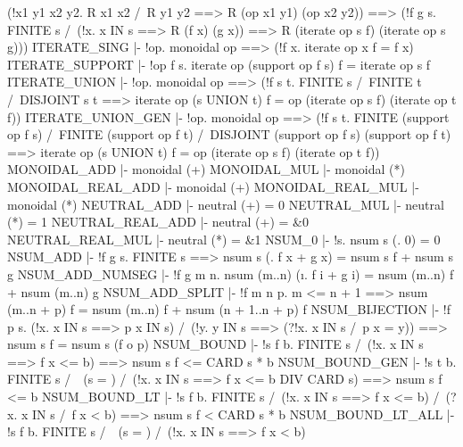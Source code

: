                    (!x1 y1 x2 y2.
                        R x1 x2 /\ R y1 y2 ==> R (op x1 y1) (op x2 y2))
                   ==> (!f g s.
                            FINITE s /\ (!x. x IN s ==> R (f x) (g x))
                            ==> R (iterate op s f) (iterate op s g)))
\ENDTHEOREM
\THEOREM ITERATE\_SING
  |- !op. monoidal op ==> (!f x. iterate op {x} f = f x)
\ENDTHEOREM
\THEOREM ITERATE\_SUPPORT
  |- !op f s. iterate op (support op f s) f = iterate op s f
\ENDTHEOREM
\THEOREM ITERATE\_UNION
  |- !op. monoidal op
          ==> (!f s t.
                   FINITE s /\ FINITE t /\ DISJOINT s t
                   ==> iterate op (s UNION t) f =
                       op (iterate op s f) (iterate op t f))
\ENDTHEOREM
\THEOREM ITERATE\_UNION\_GEN
  |- !op. monoidal op
          ==> (!f s t.
                   FINITE (support op f s) /\
                   FINITE (support op f t) /\
                   DISJOINT (support op f s) (support op f t)
                   ==> iterate op (s UNION t) f =
                       op (iterate op s f) (iterate op t f))
\ENDTHEOREM
\THEOREM MONOIDAL\_ADD
  |- monoidal (+)
\ENDTHEOREM
\THEOREM MONOIDAL\_MUL
  |- monoidal (*)
\ENDTHEOREM
\THEOREM MONOIDAL\_REAL\_ADD
  |- monoidal (+)
\ENDTHEOREM
\THEOREM MONOIDAL\_REAL\_MUL
  |- monoidal (*)
\ENDTHEOREM
\THEOREM NEUTRAL\_ADD
  |- neutral (+) = 0
\ENDTHEOREM
\THEOREM NEUTRAL\_MUL
  |- neutral (*) = 1
\ENDTHEOREM
\THEOREM NEUTRAL\_REAL\_ADD
  |- neutral (+) = &0
\ENDTHEOREM
\THEOREM NEUTRAL\_REAL\_MUL
  |- neutral (*) = &1
\ENDTHEOREM
\THEOREM NSUM\_0
  |- !s. nsum s (\n. 0) = 0
\ENDTHEOREM
\THEOREM NSUM\_ADD
  |- !f g s. FINITE s ==> nsum s (\x. f x + g x) = nsum s f + nsum s g
\ENDTHEOREM
\THEOREM NSUM\_ADD\_NUMSEG
  |- !f g m n. nsum (m..n) (\i. f i + g i) = nsum (m..n) f + nsum (m..n) g
\ENDTHEOREM
\THEOREM NSUM\_ADD\_SPLIT
  |- !f m n p.
         m <= n + 1
         ==> nsum (m..n + p) f = nsum (m..n) f + nsum (n + 1..n + p) f
\ENDTHEOREM
\THEOREM NSUM\_BIJECTION
  |- !f p s.
         (!x. x IN s ==> p x IN s) /\
         (!y. y IN s ==> (?!x. x IN s /\ p x = y))
         ==> nsum s f = nsum s (f o p)
\ENDTHEOREM
\THEOREM NSUM\_BOUND
  |- !s f b. FINITE s /\ (!x. x IN s ==> f x <= b) ==> nsum s f <= CARD s * b
\ENDTHEOREM
\THEOREM NSUM\_BOUND\_GEN
  |- !s t b.
         FINITE s /\ ~(s = {}) /\ (!x. x IN s ==> f x <= b DIV CARD s)
         ==> nsum s f <= b
\ENDTHEOREM
\THEOREM NSUM\_BOUND\_LT
  |- !s f b.
         FINITE s /\ (!x. x IN s ==> f x <= b) /\ (?x. x IN s /\ f x < b)
         ==> nsum s f < CARD s * b
\ENDTHEOREM
\THEOREM NSUM\_BOUND\_LT\_ALL
  |- !s f b.
         FINITE s /\ ~(s = {}) /\ (!x. x IN s ==> f x < b)
